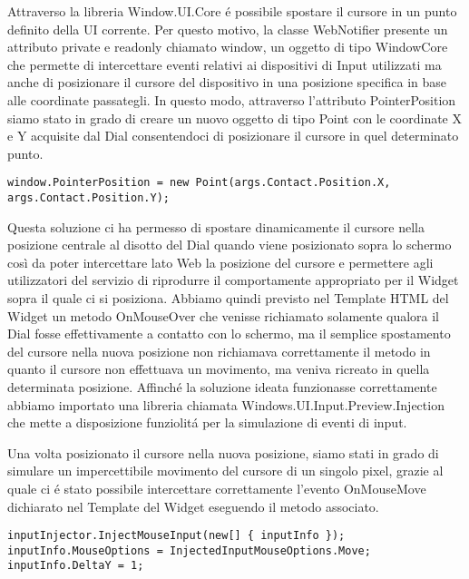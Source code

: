 Attraverso la libreria Window.UI.Core é possibile spostare il cursore in un punto definito della UI corrente. Per questo motivo, la classe WebNotifier presente un attributo private e readonly chiamato window, un oggetto di tipo WindowCore che permette di intercettare eventi relativi ai dispositivi di Input utilizzati ma anche di posizionare il cursore del dispositivo in una posizione specifica in base alle coordinate passategli. In questo modo, attraverso l’attributo PointerPosition siamo stato in grado di creare un nuovo oggetto di tipo Point con le coordinate X e Y acquisite dal Dial consentendoci di posizionare il cursore in quel determinato punto.
\vspace{1.0cm}
\begin{lstlisting}[caption={Spostamento cursore},style=javaScriptCode]
  window.PointerPosition = new Point(args.Contact.Position.X, args.Contact.Position.Y);
\end{lstlisting} 
\vspace{1.0cm}
Questa soluzione ci ha permesso di spostare dinamicamente il cursore nella posizione centrale al disotto del Dial quando viene posizionato sopra lo schermo così da poter intercettare lato Web la posizione del cursore e permettere agli utilizzatori del servizio di riprodurre il comportamente appropriato per il Widget sopra il quale ci si posiziona.
Abbiamo quindi previsto nel Template HTML del Widget un metodo OnMouseOver che venisse richiamato solamente qualora il Dial fosse effettivamente a contatto con lo schermo, ma il semplice spostamento del cursore nella nuova posizione non richiamava correttamente il metodo in quanto il cursore non effettuava un movimento, ma veniva ricreato in quella determinata posizione.
Affinché la soluzione ideata funzionasse correttamente abbiamo importato una libreria chiamata Windows.UI.Input.Preview.Injection che mette a disposizione funziolitá per la simulazione di eventi di input.

Una volta posizionato il cursore nella nuova posizione, siamo stati in grado di simulare un impercettibile movimento del cursore di un singolo pixel, grazie al quale ci é stato possibile intercettare correttamente l’evento OnMouseMove dichiarato nel Template del Widget eseguendo il metodo associato.

\vspace{1.0cm}
\begin{lstlisting}[caption={Spostamento cursore},style=javaScriptCode]
inputInjector.InjectMouseInput(new[] { inputInfo });
inputInfo.MouseOptions = InjectedInputMouseOptions.Move;
inputInfo.DeltaY = 1;
\end{lstlisting} 
\vspace{1.0cm}
